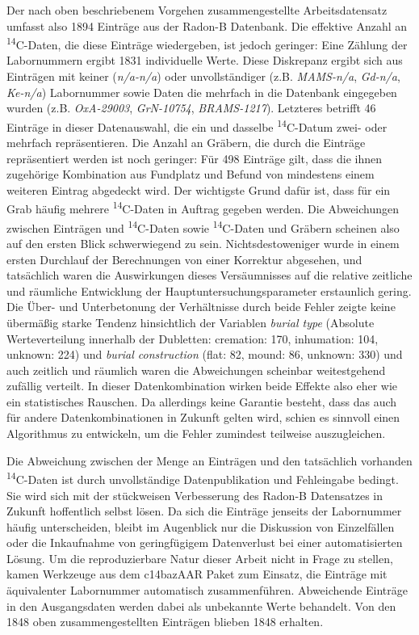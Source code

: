 \documentclass[openany,twoside,twocolumn]{book}
\begin{document}
Der nach oben beschriebenem Vorgehen zusammengestellte Arbeitsdatensatz
umfasst also 1894 Einträge aus der Radon-B Datenbank. Die effektive
Anzahl an \textsuperscript{14}C-Daten, die diese Einträge wiedergeben,
ist jedoch geringer: Eine Zählung der Labornummern ergibt 1831
individuelle Werte. Diese Diskrepanz ergibt sich aus Einträgen mit
keiner (\emph{n/a-n/a}) oder unvollständiger (z.B. \emph{MAMS-n/a},
\emph{Gd-n/a}, \emph{Ke-n/a}) Labornummer sowie Daten die mehrfach in
die Datenbank eingegeben wurden (z.B. \emph{OxA-29003},
\emph{GrN-10754}, \emph{BRAMS-1217}). Letzteres betrifft 46 Einträge in
dieser Datenauswahl, die ein und dasselbe \textsuperscript{14}C-Datum
zwei- oder mehrfach repräsentieren. Die Anzahl an Gräbern, die durch die
Einträge repräsentiert werden ist noch geringer: Für 498 Einträge gilt,
dass die ihnen zugehörige Kombination aus Fundplatz und Befund von
mindestens einem weiteren Eintrag abgedeckt wird. Der wichtigste Grund
dafür ist, dass für ein Grab häufig mehrere \textsuperscript{14}C-Daten
in Auftrag gegeben werden. Die Abweichungen zwischen Einträgen und
\textsuperscript{14}C-Daten sowie \textsuperscript{14}C-Daten und
Gräbern scheinen also auf den ersten Blick schwerwiegend zu sein.
Nichtsdestoweniger wurde in einem ersten Durchlauf der Berechnungen von
einer Korrektur abgesehen, und tatsächlich waren die Auswirkungen dieses
Versäumnisses auf die relative zeitliche und räumliche Entwicklung der
Hauptuntersuchungsparameter erstaunlich gering. Die Über- und
Unterbetonung der Verhältnisse durch beide Fehler zeigte keine übermäßig
starke Tendenz hinsichtlich der Variablen \emph{burial type} (Absolute
Werteverteilung innerhalb der Dubletten: cremation: 170, inhumation:
104, unknown: 224) und \emph{burial construction} (flat: 82, mound: 86,
unknown: 330) und auch zeitlich und räumlich waren die Abweichungen
scheinbar weitestgehend zufällig verteilt. In dieser Datenkombination
wirken beide Effekte also eher wie ein statistisches Rauschen. Da
allerdings keine Garantie besteht, dass das auch für andere
Datenkombinationen in Zukunft gelten wird, schien es sinnvoll einen
Algorithmus zu entwickeln, um die Fehler zumindest teilweise
auszugleichen.

Die Abweichung zwischen der Menge an Einträgen und den tatsächlich
vorhanden \textsuperscript{14}C-Daten ist durch unvollständige
Datenpublikation und Fehleingabe bedingt. Sie wird sich mit der
stückweisen Verbesserung des Radon-B Datensatzes in Zukunft hoffentlich
selbst lösen. Da sich die Einträge jenseits der Labornummer häufig
unterscheiden, bleibt im Augenblick nur die Diskussion von Einzelfällen
oder die Inkaufnahme von geringfügigem Datenverlust bei einer
automatisierten Lösung. Um die reproduzierbare Natur dieser Arbeit nicht
in Frage zu stellen, kamen Werkzeuge aus dem c14bazAAR Paket zum
Einsatz, die Einträge mit äquivalenter Labornummer automatisch
zusammenführen. Abweichende Einträge in den Ausgangsdaten werden dabei
als unbekannte Werte behandelt. Von den 1848 oben zusammengestellten
Einträgen blieben 1848 erhalten.
\end{document}
